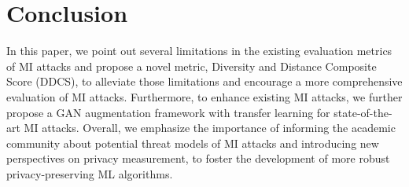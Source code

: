 \section{Conclusion}
\label{sec:conclusion}
In this paper, we point out several limitations in the existing evaluation metrics of MI attacks and propose a novel metric, Diversity and Distance Composite Score (DDCS), to alleviate those limitations and encourage a more comprehensive evaluation of MI attacks.
Furthermore, to enhance existing MI attacks, we further propose a GAN augmentation framework with transfer learning for state-of-the-art MI attacks.
Overall, we emphasize the importance of informing the academic community about potential threat models of MI attacks and introducing new perspectives on privacy measurement, to foster the development of more robust privacy-preserving ML algorithms.

